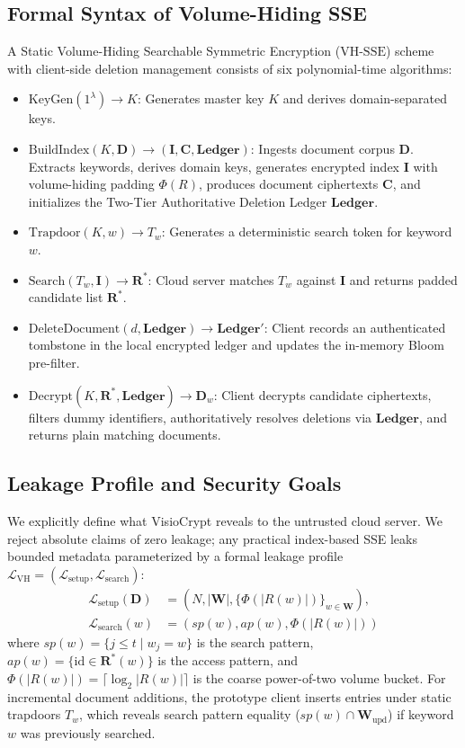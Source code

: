 \documentclass[10pt,conference]{IEEEtran}
\begin{document}
\subsection{Formal Syntax of Volume-Hiding SSE}
A Static Volume-Hiding Searchable Symmetric Encryption ($\text{VH-SSE}$) scheme with client-side deletion management consists of six polynomial-time algorithms:
\begin{itemize}
    \item $\text{KeyGen}(1^\lambda) \to K$: Generates master key $K$ and derives domain-separated keys.
    \item $\text{BuildIndex}(K, \mathbf{D}) \to (\mathbf{I}, \mathbf{C}, \mathbf{Ledger})$: Ingests document corpus $\mathbf{D}$. Extracts keywords, derives domain keys, generates encrypted index $\mathbf{I}$ with volume-hiding padding $\Phi(R)$, produces document ciphertexts $\mathbf{C}$, and initializes the Two-Tier Authoritative Deletion Ledger $\mathbf{Ledger}$.
    \item $\text{Trapdoor}(K, w) \to T_w$: Generates a deterministic search token for keyword $w$.
    \item $\text{Search}(T_w, \mathbf{I}) \to \mathbf{R}^*$: Cloud server matches $T_w$ against $\mathbf{I}$ and returns padded candidate list $\mathbf{R}^*$.
    \item $\text{DeleteDocument}(d, \mathbf{Ledger}) \to \mathbf{Ledger}'$: Client records an authenticated tombstone in the local encrypted ledger and updates the in-memory Bloom pre-filter.
    \item $\text{Decrypt}(K, \mathbf{R}^*, \mathbf{Ledger}) \to \mathbf{D}_w$: Client decrypts candidate ciphertexts, filters dummy identifiers, authoritatively resolves deletions via $\mathbf{Ledger}$, and returns plain matching documents.
\end{itemize}

\subsection{Leakage Profile and Security Goals}
We explicitly define what VisioCrypt reveals to the untrusted cloud server. We reject absolute claims of zero leakage; any practical index-based SSE leaks bounded metadata parameterized by a formal leakage profile $\mathcal{L}_{\text{VH}} = (\mathcal{L}_{\text{setup}}, \mathcal{L}_{\text{search}})$:
\begin{align}
\mathcal{L}_{\text{setup}}(\mathbf{D}) &= \left(N, |\mathbf{W}|, \{\Phi(|R(w)|)\}_{w \in \mathbf{W}}\right), \\
\mathcal{L}_{\text{search}}(w) &= \left(sp(w), ap(w), \Phi(|R(w)|)\right)
\end{align}
where $sp(w) = \{ j \le t \mid w_j = w \}$ is the search pattern, $ap(w) = \{ \text{id} \in \mathbf{R}^*(w) \}$ is the access pattern, and $\Phi(|R(w)|) = \lceil \log_2 |R(w)| \rceil$ is the coarse power-of-two volume bucket. For incremental document additions, the prototype client inserts entries under static trapdoors $T_w$, which reveals search pattern equality ($sp(w) \cap \mathbf{W}_{\text{upd}}$) if keyword $w$ was previously searched.
\end{document}
